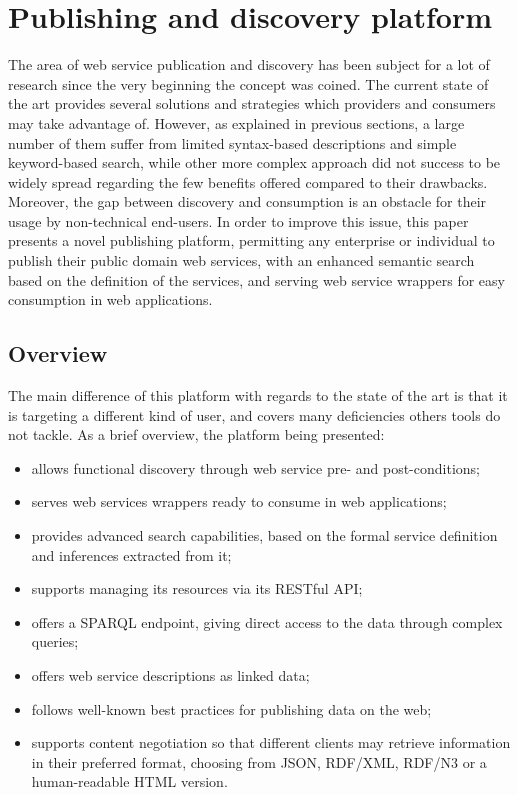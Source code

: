 
\section{Publishing and discovery platform}
\label{sec:discovery}

The area of web service publication and discovery has been subject for a lot of research since the very beginning the 
concept was coined. The current state of the art provides several solutions and strategies which providers and 
consumers may take advantage of. However, as explained in previous sections, a large number of them suffer from 
limited syntax-based descriptions and simple keyword-based search, while other more complex approach did not success
to be widely spread regarding the few benefits offered compared to their drawbacks. Moreover, the gap between discovery 
and consumption is an obstacle for their usage by non-technical end-users. In order to improve this issue, 
this paper presents a novel publishing platform, permitting any enterprise or individual to publish their public 
domain web services, with an enhanced semantic search based on the definition of the services, and serving web 
service wrappers for easy consumption in web applications.

\subsection{Overview}
\label{ssec:overview}

The main difference of this platform with regards to the state of the art is that it is targeting a different kind of user, and covers many deficiencies others tools do not tackle. As a brief overview, the platform being presented:

\begin{itemize}
  \item allows functional discovery through web service pre- and post-conditions;
	\item serves web services wrappers ready to consume in web applications;
	\item provides advanced search capabilities, based on the formal service definition and inferences extracted from it;
	\item supports managing its resources via its RESTful API;
	\item offers a SPARQL endpoint, giving direct access to the data through complex queries;
	\item offers web service descriptions as linked data;
	\item follows well-known best practices for publishing data on the web;
	\item supports content negotiation so that different clients may retrieve information in their preferred format, choosing from JSON, RDF/XML, RDF/N3 or a human-readable HTML version.
\end{itemize}

